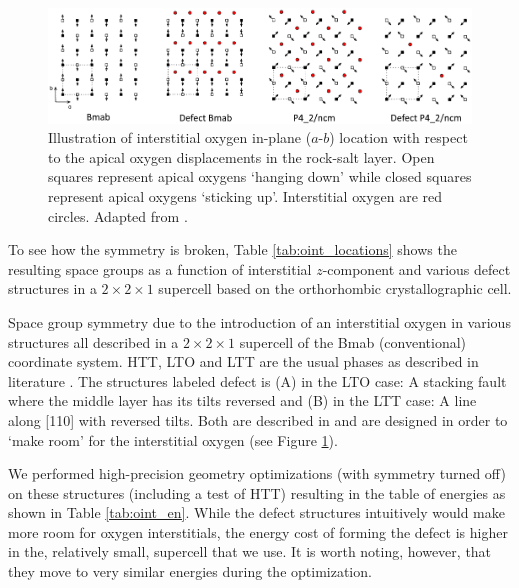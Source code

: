 \begin{figure}
    \centering
    \includegraphics[width=\textwidth]{fig/md/oint.png}
    \caption[Illustration of interstitial positions]{Illustration of interstitial oxygen in-plane ($a$-$b$) location with respect to the apical oxygen displacements in the rock-salt layer. Open squares represent apical oxygens `hanging down' while closed squares represent apical oxygens `sticking up'. Interstitial oxygen are red circles. Adapted from \cite{Tranquada1994}.}
    \label{fig:oint_location}
\end{figure}

To see how the symmetry is broken, Table \ref{tab:oint_locations} shows the resulting space groups as a function of interstitial $z$-component and various defect structures in a $2 \times 2 \times 1$ supercell based on the orthorhombic crystallographic cell. 

\begin{table}
	\centering
	\caption[Oxygen interstitial phases]{Space group symmetry due to the introduction of an interstitial oxygen in various structures all described in a $2 \times 2 \times 1$ supercell of the Bmab (conventional) coordinate system. HTT, LTO and LTT are the usual phases as described in literature \cite{Hucker2012}. The structures labeled defect is (A) in the LTO case: A stacking fault where the middle layer has its tilts reversed and (B) in the LTT case: A line along [110] with reversed tilts. Both are described in \cite{Tranquada1994} and are designed in order to `make room' for the interstitial oxygen (see Figure \ref{fig:oint_location}).}
    \label{tab:oint_locations}
    
\end{table}

We performed high-precision geometry optimizations (with symmetry turned off) on these structures (including a test of HTT) resulting in the table of energies as shown in Table \ref{tab:oint_en}. While the defect structures intuitively would make more room for oxygen interstitials, the energy cost of forming the defect is higher in the, relatively small, supercell that we use. It is worth noting, however, that they move to very similar energies during the optimization.

